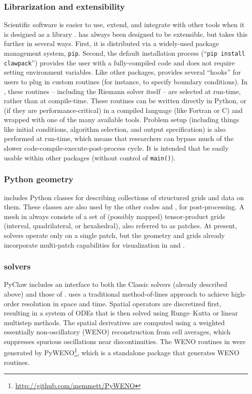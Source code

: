 \subsubsection{Librarization and extensibility}
Scientific software is easier to use, extend, and integrate with other tools
when it is designed as a library \cite{Brown:2015cj}.  \clawpack has always been
designed to be extensible, but \pyclaw takes this further in several ways.
First, it is distributed via a widely-used package management system,
\texttt{pip}. Second, the default installation process (``\texttt{pip install
clawpack}'') provides the user with a fully-compiled code and does not require
setting environment variables.  Like other \clawpack packages, \pyclaw provides
several ``hooks'' for users to plug in custom routines (for instance, to specify
boundary conditions). In \pyclaw, these routines -- including the Riemann solver
itself -- are selected at run-time, rather than at compile-time.  These routines
can be written directly in Python, or (if they are performance-critical) in a
compiled language (like Fortran or C) and wrapped with one of the many available
tools.  Problem setup (including things like initial conditions, algorithm
selection, and output specification) is also performed at run-time, which means
that researchers can bypass much of the slower code-compile-execute-post-process
cycle. It is intended that \pyclaw be easily usable within other packages
(without control of \texttt{main()}).

\subsubsection{Python geometry}
\pyclaw includes Python classes for describing collections of structured grids
and data on them. These classes are also used by the other codes and
\visclaw, for post-processing.  A mesh in \clawpack always consists of a set of
(possibly mapped) tensor-product
grids (interval, quadrilateral, or hexahedral), also referred to as patches.
At present, \pyclaw solvers operate only on a single patch, but the
geometry and grids already incorporate multi-patch
capabilities for visualization in \amrclaw and \geoclaw.

\subsubsection{\pyclaw solvers}

PyClaw includes an interface to both the Classic solvers (already
described above) and those of \sharpclaw \cite{ketcheson2012pyclaw}.
\sharpclaw uses a traditional method-of-lines approach to achieve
high-order resolution in space and time.  Spatial operators are
discretized first, resulting in a system of ODEs that is then solved
using Runge--Kutta or linear multistep methods.  The spatial
derivatives are computed using a weighted essentially non-oscillatory
(WENO) reconstruction from cell averages, which suppresses spurious
oscillations near discontinuities.  The WENO routines in \sharpclaw
were generated by PyWENO\footnote{\url{http://github.com/memmett/PyWENO}}, which
is a standalone package
that generates WENO routines.


